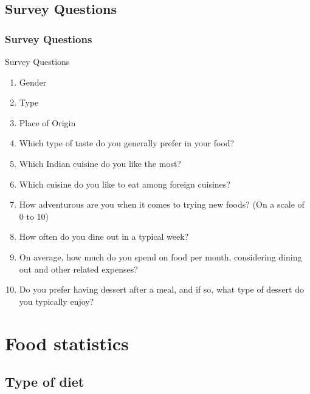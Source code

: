 \documentclass{beamer}
\begin{document}

\subsection{Survey Questions}

\begin{frame}
    \frametitle{Survey Questions}
    
    \begin{block}{Survey Questions}
        \begin{enumerate}
            \item Gender
            \item Type
            \item Place of Origin
            \item Which type of taste do you generally prefer in your food?
            \item Which Indian cuisine do you like the most?
            \item Which cuisine do you like to eat among foreign cuisines?
            \item How adventurous are you when it comes to trying new foods? (On a scale of 0 to 10)
            \item How often do you dine out in a typical week?
            \item On average, how much do you spend on food per month, considering dining out and other related expenses?
            \item Do you prefer having dessert after a meal, and if so, what type of dessert do you typically enjoy?
        \end{enumerate}
    \end{block}

\end{frame}

\section{Food statistics }

\subsection{Type of diet }
\end{document}
